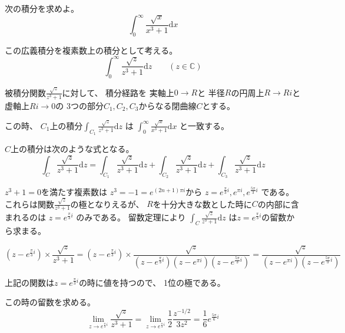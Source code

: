 \documentclass[12pt,b5paper]{ltjsarticle}
\begin{document}
\hrulefill

次の積分を求めよ。
\begin{equation}
 \int_{0}^{\infty} \frac{\sqrt{x}}{x^3+1}\mathrm{d}x
\end{equation}

\dotfill

この広義積分を複素数上の積分として考える。
\begin{equation}
 \int_{0}^{\infty} \frac{\sqrt{z}}{z^3+1}\mathrm{d}z
  \qquad (z\in\mathbb{C})
\end{equation}

被積分関数$\frac{\sqrt{z}}{z^3+1}$に対して、
積分経路を
実軸上$0\to R$と
半径$R$の円周上$R\to Ri$と
虚軸上$Ri\to 0$の
3つの部分$C_1,C_2,C_3$からなる閉曲線$C$とする。

この時、
$C_1$上の積分$\int_{C_1} \frac{\sqrt{z}}{z^3+1}\mathrm{d}z$
は
$\int_{0}^{\infty} \frac{\sqrt{x}}{x^3+1}\mathrm{d}x$
と一致する。

$C$上の積分は次のような式となる。
\begin{equation}
 \int_{C} \frac{\sqrt{z}}{z^3+1}\mathrm{d}z
  =
 \int_{C_1} \frac{\sqrt{z}}{z^3+1}\mathrm{d}z
 +
 \int_{C_2} \frac{\sqrt{z}}{z^3+1}\mathrm{d}z
 +
 \int_{C_3} \frac{\sqrt{z}}{z^3+1}\mathrm{d}z
\end{equation}


$z^3+1=0$を満たす複素数は
$z^3=-1=e^{(2n+1)\pi i}$から
$z=e^{\frac{\pi}{3}i},e^{\pi i},e^{\frac{5\pi}{3}i}$
である。
これらは関数$\frac{\sqrt{z}}{z^3+1}$の極となりえるが、
$R$を十分大きな数とした時に$C$の内部に含まれるのは
$z=e^{\frac{\pi}{3}i}$
のみである。
留数定理により
$\int_{C} \frac{\sqrt{z}}{z^3+1}\mathrm{d}z$
は$z=e^{\frac{\pi}{3}i}$の留数から求まる。

\begin{equation}
 (z-e^{\frac{\pi}{3}i})\times \frac{\sqrt{z}}{z^3+1}
  =
   (z-e^{\frac{\pi}{3}i})\times \frac{\sqrt{z}}{(z-e^{\frac{\pi}{3}i})(z-e^{\pi i})(z-e^{\frac{5\pi}{3}i})}
   =
   \frac{\sqrt{z}}{(z-e^{\pi i})(z-e^{\frac{5\pi}{3}i})}
\end{equation}

上記の関数は$z=e^{\frac{\pi}{3}i}$の時に値を持つので、
1位の極である。

この時の留数を求める。
\begin{equation}
 \lim_{z\to e^{\frac{\pi}{3}i}}\frac{\sqrt{z}}{z^3+1}
  =\lim_{z\to e^{\frac{\pi}{3}i}} \frac{1}{2}\frac{z^{-1/2}}{3z^2}
  =\frac{1}{6} e^{\frac{5\pi}{6}i}
\end{equation}
\end{document}
